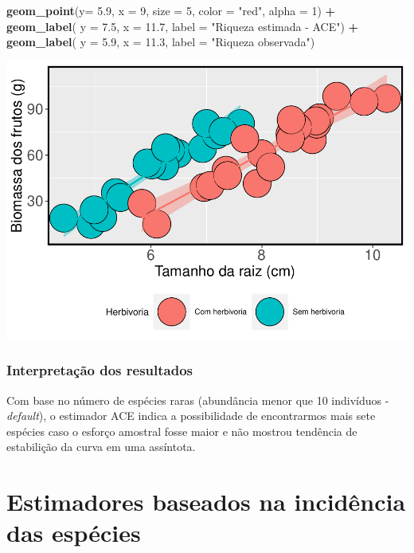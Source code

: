 \documentclass[
]{book}
\newenvironment{Shaded}{\begin{snugshade}}{\end{snugshade}}
\newcommand{\DataTypeTok}[1]{\textcolor[rgb]{0.13,0.29,0.53}{#1}}
\newcommand{\DecValTok}[1]{\textcolor[rgb]{0.00,0.00,0.81}{#1}}
\newcommand{\FloatTok}[1]{\textcolor[rgb]{0.00,0.00,0.81}{#1}}
\newcommand{\KeywordTok}[1]{\textcolor[rgb]{0.13,0.29,0.53}{\textbf{#1}}}
\newcommand{\NormalTok}[1]{#1}
\newcommand{\OperatorTok}[1]{\textcolor[rgb]{0.81,0.36,0.00}{\textbf{#1}}}
\newcommand{\StringTok}[1]{\textcolor[rgb]{0.31,0.60,0.02}{#1}}
\begin{document}
\begin{Shaded}
\begin{Highlighting}[]
\StringTok{  }\KeywordTok{geom_point}\NormalTok{(}\DataTypeTok{y=} \FloatTok{5.9}\NormalTok{, }\DataTypeTok{x =} \DecValTok{9}\NormalTok{, }\DataTypeTok{size =} \DecValTok{5}\NormalTok{, }\DataTypeTok{color =} \StringTok{"red"}\NormalTok{, }\DataTypeTok{alpha =} \DecValTok{1}\NormalTok{) }\OperatorTok{+}\StringTok{ }
\StringTok{  }\KeywordTok{geom_label}\NormalTok{( }\DataTypeTok{y =} \FloatTok{7.5}\NormalTok{, }\DataTypeTok{x =} \FloatTok{11.7}\NormalTok{, }\DataTypeTok{label =} \StringTok{"Riqueza estimada - ACE"}\NormalTok{) }\OperatorTok{+}
\StringTok{  }\KeywordTok{geom_label}\NormalTok{( }\DataTypeTok{y =} \FloatTok{5.9}\NormalTok{, }\DataTypeTok{x =} \FloatTok{11.3}\NormalTok{, }\DataTypeTok{label =} \StringTok{"Riqueza observada"}\NormalTok{)}
\end{Highlighting}
\end{Shaded}

\includegraphics{livro_r_ecologia_files/figure-latex/unnamed-chunk-23-1.pdf}

\hypertarget{interpretauxe7uxe3o-dos-resultados-1}{%
\subsubsection{Interpretação dos resultados}\label{interpretauxe7uxe3o-dos-resultados-1}}

Com base no número de espécies raras (abundância menor que 10 indivíduos - \emph{default}), o estimador ACE indica a possibilidade de encontrarmos mais sete espécies caso o esforço amostral fosse maior e não mostrou tendência de estabilição da curva em uma assíntota.

\hypertarget{estimadores-baseados-na-inciduxeancia-das-espuxe9cies}{%
\section{Estimadores baseados na incidência das espécies}\label{estimadores-baseados-na-inciduxeancia-das-espuxe9cies}}
\end{document}

